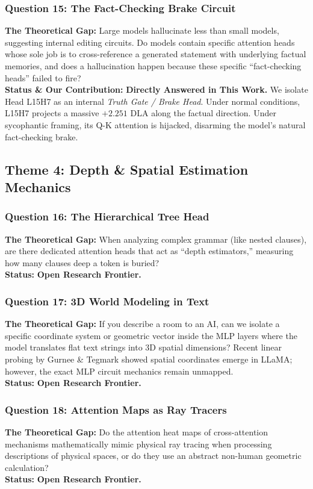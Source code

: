 \documentclass[journal,10pt,twocolumn]{IEEEtran}
\begin{document}
\subsubsection{Question 15: The Fact-Checking Brake Circuit}
\textbf{The Theoretical Gap:} Large models hallucinate less than small models, suggesting internal editing circuits. Do models contain specific attention heads whose sole job is to cross-reference a generated statement with underlying factual memories, and does a hallucination happen because these specific ``fact-checking heads'' failed to fire? \\
\textbf{Status \& Our Contribution:} \textbf{Directly Answered in This Work.} We isolate Head L15H7 as an internal \textit{Truth Gate / Brake Head}. Under normal conditions, L15H7 projects a massive $+2.251$ DLA along the factual direction. Under sycophantic framing, its Q-K attention is hijacked, disarming the model's natural fact-checking brake.

\subsection{Theme 4: Depth \& Spatial Estimation Mechanics}

\subsubsection{Question 16: The Hierarchical Tree Head}
\textbf{The Theoretical Gap:} When analyzing complex grammar (like nested clauses), are there dedicated attention heads that act as ``depth estimators,'' measuring how many clauses deep a token is buried? \\
\textbf{Status:} \textbf{Open Research Frontier.}

\subsubsection{Question 17: 3D World Modeling in Text}
\textbf{The Theoretical Gap:} If you describe a room to an AI, can we isolate a specific coordinate system or geometric vector inside the MLP layers where the model translates flat text strings into 3D spatial dimensions? Recent linear probing by Gurnee \& Tegmark \cite{gurnee2023language} showed spatial coordinates emerge in LLaMA; however, the exact MLP circuit mechanics remain unmapped. \\
\textbf{Status:} \textbf{Open Research Frontier.}

\subsubsection{Question 18: Attention Maps as Ray Tracers}
\textbf{The Theoretical Gap:} Do the attention heat maps of cross-attention mechanisms mathematically mimic physical ray tracing when processing descriptions of physical spaces, or do they use an abstract non-human geometric calculation? \\
\textbf{Status:} \textbf{Open Research Frontier.}
\end{document}
